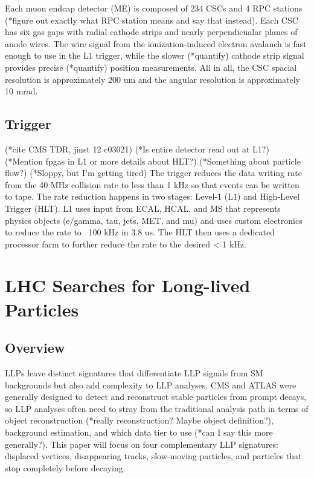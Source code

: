 \documentclass[12pt]{article}
\begin{document}
    Each muon endcap detector (ME) is composed of 234 CSCs and 4 RPC stations (*figure out exactly what RPC station means and say that instead). Each CSC has six gas gaps with radial cathode strips and nearly perpendicualar planes of anode wires. The wire signal from the ionization-induced electron avalanch is fast enough to use in the L1 trigger, while the slower (*quantify) cathode strip signal provides precise (*quantify) position measurements. All in all, the CSC spacial resolution is approximately 200 um and the angular resolution is approximately 10 mrad.

\subsection{Trigger}
    (*cite CMS TDR, jinst 12 c03021)
    (*Is entire detector read out at L1?)
    (*Mention fpgas in L1 or more details about HLT?)
    (*Something about particle flow?)
    (*Sloppy, but I'm getting tired)
    The trigger reduces the data writing rate from the 40 MHz collision rate to less than 1 kHz so that events can be written to tape. The rate reduction happens in two stages: Level-1 (L1) and High-Level Trigger (HLT). L1 uses input from ECAL, HCAL, and MS that represents physics objects (e/gamma, tau, jets, MET, and mu) and uses custom electronics to reduce the rate to ~100 kHz in 3.8 us. The HLT then uses a dedicated processor farm to further reduce the rate to the desired < 1 kHz.

\section{LHC Searches for Long-lived Particles}
\subsection{Overview}
    LLPs leave distinct signatures that differentiate LLP signals from SM backgrounds but also add complexity to LLP analyses. CMS and ATLAS were generally designed to detect and reconstruct stable particles from prompt decays, so LLP analyses often need to stray from the traditional analysis path in terms of object reconstruction (*really reconstruction? Maybe object definition?), background estimation, and which data tier to use (*can I say this more generally?). This paper will focus on four complementary LLP signatures: displaced vertices, disappearing tracks, slow-moving particles, and particles that stop completely before decaying.
\end{document}
